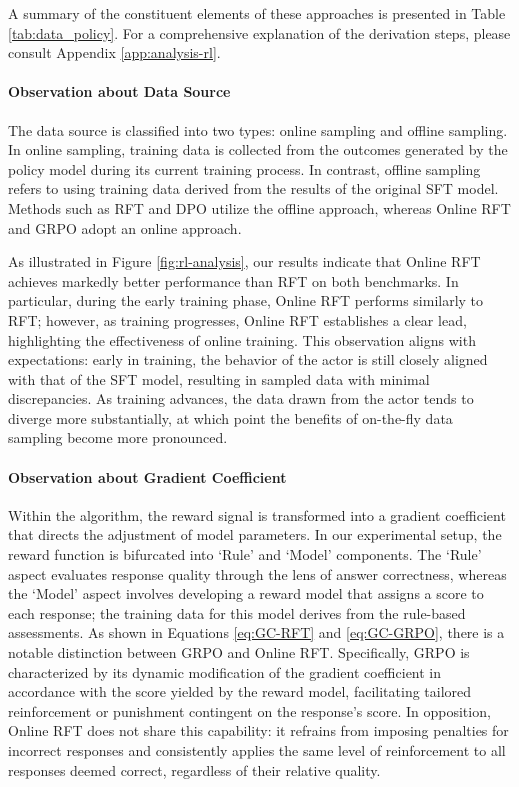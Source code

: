\begin{itemize}[topsep=0pt]
\begin{itemize}[topsep=0pt]
A summary of the constituent elements of these approaches is presented in Table \ref{tab:data_policy}. For a comprehensive explanation of the derivation steps, please consult Appendix \ref{app:analysis-rl}.

\paragraph{Observation about Data Source} The data source is classified into two types: online sampling and offline sampling. In online sampling, training data is collected from the outcomes generated by the policy model during its current training process. In contrast, offline sampling refers to using training data derived from the results of the original SFT model. Methods such as RFT and DPO utilize the offline approach, whereas Online RFT and GRPO adopt an online approach.

As illustrated in Figure \ref{fig:rl-analysis}, our results indicate that Online RFT achieves markedly better performance than RFT on both benchmarks. In particular, during the early training phase, Online RFT performs similarly to RFT; however, as training progresses, Online RFT establishes a clear lead, highlighting the effectiveness of online training. This observation aligns with expectations: early in training, the behavior of the actor is still closely aligned with that of the SFT model, resulting in sampled data with minimal discrepancies. As training advances, the data drawn from the actor tends to diverge more substantially, at which point the benefits of on-the-fly data sampling become more pronounced.

\paragraph{Observation about Gradient Coefficient} Within the algorithm, the reward signal is transformed into a gradient coefficient that directs the adjustment of model parameters. In our experimental setup, the reward function is bifurcated into `Rule' and `Model' components. The `Rule' aspect evaluates response quality through the lens of answer correctness, whereas the `Model' aspect involves developing a reward model that assigns a score to each response; the training data for this model derives from the rule-based assessments. As shown in Equations \ref{eq:GC-RFT} and \ref{eq:GC-GRPO}, there is a notable distinction between GRPO and Online RFT. Specifically, GRPO is characterized by its dynamic modification of the gradient coefficient in accordance with the score yielded by the reward model, facilitating tailored reinforcement or punishment contingent on the response's score. In opposition, Online RFT does not share this capability: it refrains from imposing penalties for incorrect responses and consistently applies the same level of reinforcement to all responses deemed correct, regardless of their relative quality.


\end{itemize}
\end{itemize}
